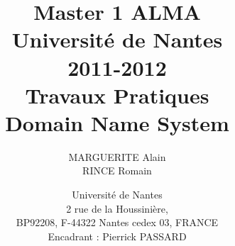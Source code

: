 \documentclass[12pt,a4paper,utf8x]{report}
\title
{
	\normalsize{Master 1 ALMA\\
	Université de Nantes\\
	2011-2012}\\
	\vspace{15mm}
	\Huge{Travaux Pratiques\\ Domain Name System}
}
\author{MARGUERITE Alain\\RINCE Romain
	\vspace{45mm}
}
\date
{	
	\normalsize{Université de Nantes \\ 2 rue de la Houssinière,\\ BP92208, F-44322 Nantes cedex 03, FRANCE
	\\ 
	\vspace{5mm}	
	Encadrant : Pierrick PASSARD\\
	}
}
\begin{document}
\maketitle


\tableofcontents
\clearpage

\begin{onehalfspace}




\end{onehalfspace}


\printindex

\appendix
\end{document}
